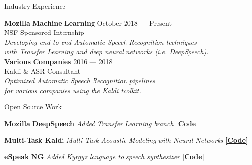 \documentclass{resume} %
\begin{document}
\begin{rSection}{Industry Experience}
  
{\bf Mozilla Machine Learning} \hfill {October 2018 --- Present} \\ 
NSF-Sponsored Internship \hfill {} \\
\textit{Developing end-to-end Automatic Speech Recognition techniques} \hfill {} \\
\textit{with Transfer Learning and deep neural networks (i.e. DeepSpeech).} \hfill {} \\
  
{\bf Various Companies} \hfill {2016 --- 2018} \\ 
Kaldi \& ASR Consultant  \hfill {} \\
\textit{Optimized Automatic Speech Recognition pipelines}   \hfill {} \\
\textit{for various companies using the Kaldi toolkit.}   \hfill {} \\
\end{rSection}



\begin{rSection}{Open Source Work}

  {\textbf{Mozilla DeepSpeech}} {\hfill \textit{Added Transfer Learning branch} {\hspace{2.5cm} \href{https://github.com/mozilla/DeepSpeech/tree/transfer-learning}{\textbf{[Code]}}}} \\
\vspace{-.35cm}

{\textbf{Multi-Task Kaldi}} {\hfill \textit{Multi-Task Acoustic Modeling with Neural Networks} {\hspace{2.5cm} \href{https://github.com/JRMeyer/multi-task-kaldi}{\textbf{[Code]}}}} \\
\vspace{-.35cm}

{\textbf{eSpeak NG}} {\hfill \textit{Added Kyrgyz language to speech synthesizer} {\hspace{2.5cm} \href{https://github.com/rhdunn/espeak/commits?author=JRMeyer}{\textbf{[Code]}}}}\\
\vspace{-.35cm}

\end{rSection}
\end{document}
